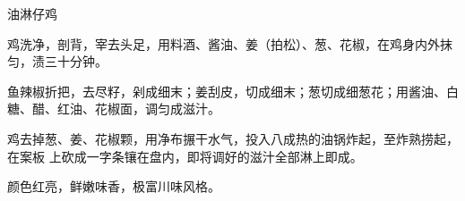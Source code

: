%
%
%
%
%
%
%
\begin{recipe}{油淋仔鸡}

\ingredients


\preparation

\step 鸡洗净，剖背，宰去头足，用料酒、酱油、姜（拍松）、葱、花椒，在鸡身内外抹
匀，渍三十分钟。

\step 鱼辣椒折把，去尽籽，剁成细末；姜刮皮，切成细末；葱切成细葱花；用酱油、白
糖、醋、红油、花椒面，调匀成滋汁。

鸡去掉葱、姜、花椒颗，用净布搌干水气，投入八成热的油锅炸起，至炸熟捞起，在案板
上砍成一字条镶在盘内，即将调好的滋汁全部淋上即成。

\features

颜色红亮，鲜嫩味香，极富川味风格。

\end{recipe}

